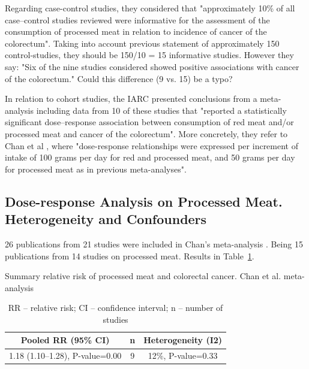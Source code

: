 \documentclass{article}
\begin{document}
Regarding case-control studies, they considered that "approximately 10\% of all case–control studies reviewed were informative for the assessment of the consumption of processed meat in relation to incidence of cancer of the colorectum". Taking into account previous statement of approximately 150 control-studies, they should be 150/10 = 15 informative studies. However they say: "Six of the nine studies considered showed positive associations with cancer of the colorectum." Could this difference (9 vs. 15) be a typo?

In relation to cohort studies, the IARC presented conclusions from a meta-analysis including data from 10
of these studies that "reported a statistically significant dose–response association between consumption
of red meat and/or processed meat and cancer of the colorectum". More concretely, they refer to Chan et al \cite{chan}, where "dose-response relationships were expressed per increment of intake of 100 grams
per day for red and processed meat, and 50 grams per day for processed meat as in previous meta-analyses".\cite{sandhu}%


\subsection{Dose-response Analysis on Processed Meat. Heterogeneity and Confounders}

26 publications from 21 studies were included in Chan's meta-analysis \cite{chan}. Being 15 publications from 14 studies on processed meat. Results in Table~\ref{tab:table}.

\begin{table}
 \caption{Summary relative risk of processed meat and colorectal cancer. Chan et al. meta-analysis}
  \centering

  \begin{center}
   \begin{tabular}{||c c c||}
   \hline
   Pooled RR (95\% CI)     & n     & Heterogeneity (I2)\\ [0.5ex]
   \hline\hline
     1.18 (1.10–1.28), P-value=0.00  & 9 & 12\%, P-value=0.33     \\ [1ex]
   \hline
  \end{tabular}

  \caption*{RR – relative risk; CI – confidence interval; n – number of studies}
  \end{center}

  \label{tab:table}
\end{table}
\end{document}
